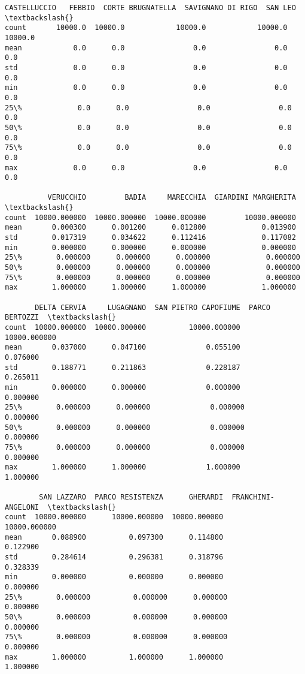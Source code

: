 \documentclass[11pt]{article}
\makeatletter
\newcommand{\boxspacing}{\kern\kvtcb@left@rule\kern\kvtcb@boxsep}
\newcommand{\prompt}[4]{
        {\ttfamily\llap{{\color{#2}[#3]:\hspace{3pt}#4}}\vspace{-\baselineskip}}
    }
\makeatother
\begin{document}
            \begin{tcolorbox}[breakable, size=fbox, boxrule=.5pt, pad at break*=1mm, opacityfill=0]
\prompt{Out}{outcolor}{25}{\boxspacing}
\begin{Verbatim}[commandchars=\\\{\}]
       CASTELLUCCIO   FEBBIO  CORTE BRUGNATELLA  SAVIGNANO DI RIGO  SAN LEO  \textbackslash{}
count       10000.0  10000.0            10000.0            10000.0  10000.0
mean            0.0      0.0                0.0                0.0      0.0
std             0.0      0.0                0.0                0.0      0.0
min             0.0      0.0                0.0                0.0      0.0
25\%             0.0      0.0                0.0                0.0      0.0
50\%             0.0      0.0                0.0                0.0      0.0
75\%             0.0      0.0                0.0                0.0      0.0
max             0.0      0.0                0.0                0.0      0.0

          VERUCCHIO         BADIA     MARECCHIA  GIARDINI MARGHERITA  \textbackslash{}
count  10000.000000  10000.000000  10000.000000         10000.000000
mean       0.000300      0.001200      0.012800             0.013900
std        0.017319      0.034622      0.112416             0.117082
min        0.000000      0.000000      0.000000             0.000000
25\%        0.000000      0.000000      0.000000             0.000000
50\%        0.000000      0.000000      0.000000             0.000000
75\%        0.000000      0.000000      0.000000             0.000000
max        1.000000      1.000000      1.000000             1.000000

       DELTA CERVIA     LUGAGNANO  SAN PIETRO CAPOFIUME  PARCO BERTOZZI  \textbackslash{}
count  10000.000000  10000.000000          10000.000000    10000.000000
mean       0.037000      0.047100              0.055100        0.076000
std        0.188771      0.211863              0.228187        0.265011
min        0.000000      0.000000              0.000000        0.000000
25\%        0.000000      0.000000              0.000000        0.000000
50\%        0.000000      0.000000              0.000000        0.000000
75\%        0.000000      0.000000              0.000000        0.000000
max        1.000000      1.000000              1.000000        1.000000

        SAN LAZZARO  PARCO RESISTENZA      GHERARDI  FRANCHINI-ANGELONI  \textbackslash{}
count  10000.000000      10000.000000  10000.000000        10000.000000
mean       0.088900          0.097300      0.114800            0.122900
std        0.284614          0.296381      0.318796            0.328339
min        0.000000          0.000000      0.000000            0.000000
25\%        0.000000          0.000000      0.000000            0.000000
50\%        0.000000          0.000000      0.000000            0.000000
75\%        0.000000          0.000000      0.000000            0.000000
max        1.000000          1.000000      1.000000            1.000000


\end{Verbatim}
\end{tcolorbox}
\end{document}

